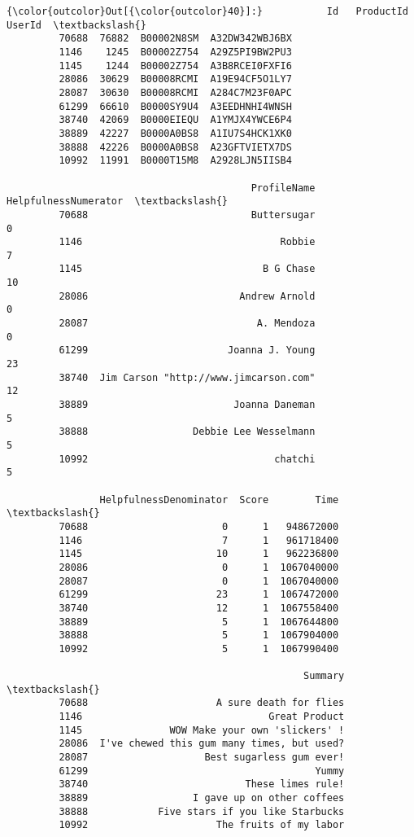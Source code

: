 \documentclass[11pt]{article}
\begin{document}
\begin{Verbatim}[commandchars=\\\{\}]
{\color{outcolor}Out[{\color{outcolor}40}]:}           Id   ProductId          UserId  \textbackslash{}
         70688  76882  B00002N8SM  A32DW342WBJ6BX   
         1146    1245  B00002Z754  A29Z5PI9BW2PU3   
         1145    1244  B00002Z754  A3B8RCEI0FXFI6   
         28086  30629  B00008RCMI  A19E94CF5O1LY7   
         28087  30630  B00008RCMI  A284C7M23F0APC   
         61299  66610  B0000SY9U4  A3EEDHNHI4WNSH   
         38740  42069  B0000EIEQU  A1YMJX4YWCE6P4   
         38889  42227  B0000A0BS8  A1IU7S4HCK1XK0   
         38888  42226  B0000A0BS8  A23GFTVIETX7DS   
         10992  11991  B0000T15M8  A2928LJN5IISB4   
         
                                          ProfileName  HelpfulnessNumerator  \textbackslash{}
         70688                            Buttersugar                     0   
         1146                                  Robbie                     7   
         1145                               B G Chase                    10   
         28086                          Andrew Arnold                     0   
         28087                             A. Mendoza                     0   
         61299                        Joanna J. Young                    23   
         38740  Jim Carson "http://www.jimcarson.com"                    12   
         38889                         Joanna Daneman                     5   
         38888                  Debbie Lee Wesselmann                     5   
         10992                                chatchi                     5   
         
                HelpfulnessDenominator  Score        Time  \textbackslash{}
         70688                       0      1   948672000   
         1146                        7      1   961718400   
         1145                       10      1   962236800   
         28086                       0      1  1067040000   
         28087                       0      1  1067040000   
         61299                      23      1  1067472000   
         38740                      12      1  1067558400   
         38889                       5      1  1067644800   
         38888                       5      1  1067904000   
         10992                       5      1  1067990400   
         
                                                   Summary  \textbackslash{}
         70688                      A sure death for flies   
         1146                                Great Product   
         1145               WOW Make your own 'slickers' !   
         28086  I've chewed this gum many times, but used?   
         28087                    Best sugarless gum ever!   
         61299                                       Yummy   
         38740                           These limes rule!   
         38889                  I gave up on other coffees   
         38888            Five stars if you like Starbucks   
         10992                      The fruits of my labor   
         

\end{Verbatim}
\end{document}
